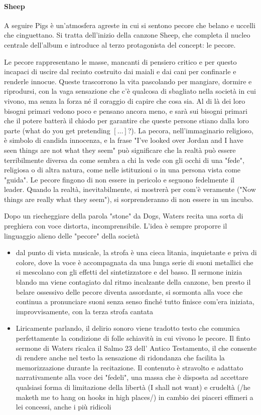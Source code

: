 \documentclass[class=book, crop=false, oneside, 12pt]{standalone}
\begin{document}
\paragraph{Sheep}
A seguire Pigs è un'atmosfera agreste in cui si sentono pecore che belano e uccelli che cinguettano. Si tratta dell'inizio della canzone Sheep, che completa il nucleo centrale dell'album e introduce al terzo protagonista del concept: le pecore.

Le pecore rappresentano le masse, mancanti di pensiero critico e per questo incapaci di uscire dal recinto costruito dai maiali e dai cani per confinarle e renderle innocue. Queste trascorrono la vita pascolando per mangiare, dormire e riprodursi, con la vaga sensazione che c'è qualcosa di sbagliato nella società in cui vivono, ma senza la forza né il coraggio di capire che cosa sia. Al di là dei loro bisogni primari vedono poco e pensano ancora meno, e sarà sui bisogni primari che il potere batterà il chiodo per garantire che queste persone stiano dalla loro parte (what do you get pretending \([\ldots]\)?). La pecora, nell'immaginario religioso, è simbolo di candida innocenza, e la frase "I've looked over Jordan and I have seen things are not what they seem" può significare che la realtà può essere terribilmente diversa da come sembra a chi la vede con gli occhi di una "fede", religiosa o di altra natura, come nelle istituzioni o in una persona vista come "guida". Le pecore fingono di non essere in pericolo e seguono fedelmente il leader. Quando la realtà, inevitabilmente, si mostrerà per com'è veramente ("Now things are really what they seem"), si sorprenderanno di non essere in un incubo.

Dopo un riecheggiare della parola "stone" da Dogs, Waters recita una sorta di preghiera con voce distorta, incomprensibile. L'idea è sempre proporre il linguaggio alieno delle "pecore" della società

\begin{itemize}
    \item dal punto di vista musicale, la strofa è una cieca litania, inquietante e priva di colore, dove la voce è accompagnata da una lunga serie di suoni metallici che si mescolano con gli effetti del sintetizzatore e del basso. Il sermone inizia blando ma viene contagiato dal ritmo incalzante della canzone, ben presto il belare ossessivo delle pecore diventa assordante, si sormonta alla voce che continua a pronunciare suoni senza senso finché tutto finisce com'era iniziata, improvvisamente, con la terza strofa cantata
    \item Liricamente parlando, il delirio sonoro viene tradotto testo che comunica perfettamente la condizione di folle schiavitù in cui vivono le pecore. Il finto sermone di Waters ricalca il Salmo 23 dell' Antico Testamento, il che consente di rendere anche nel testo la sensazione di ridondanza che facilita la memorizzazione durante la recitazione. Il contenuto è stravolto e adattato narrativamente alla voce dei  "fedeli", una massa che è disposta ad accettare qualsiasi forma di limitazione della libertà (I shall not want) e crudeltà (/he maketh me to hang on hooks in high places/) in cambio dei piaceri effimeri a lei concessi, anche i più ridicoli
\end{itemize}
\end{document}
